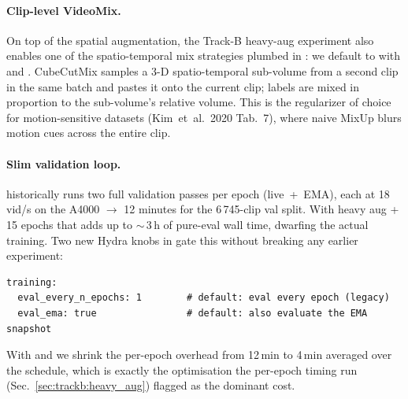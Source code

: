 \paragraph{Clip-level VideoMix.}
On top of the spatial augmentation, the Track-B heavy-aug experiment
also enables one of the
spatio-temporal mix strategies plumbed in : we
default to  with
 and . CubeCutMix
\cite{Yun2019CutMix} samples a 3-D spatio-temporal sub-volume from a
second clip in the same batch and pastes it onto the current clip;
labels are mixed in proportion to the sub-volume's relative volume.
This is the regularizer of choice for motion-sensitive datasets
(Kim~et~al.~2020 Tab.~7), where naive MixUp blurs motion cues across
the entire clip.

\paragraph{Slim validation loop.}
 historically runs two full validation passes
per epoch (live~+~EMA), each at 18\,vid/s on the A4000 \(\to\) 12
minutes for the 6\,745-clip val split. With heavy aug + 15 epochs that
adds up to \(\sim\)\,3\,h of pure-eval wall time, dwarfing the actual
training. Two new Hydra knobs in 
gate this without breaking any earlier experiment:
\begin{lstlisting}[style=yaml]
training:
  eval_every_n_epochs: 1        # default: eval every epoch (legacy)
  eval_ema: true                # default: also evaluate the EMA snapshot
\end{lstlisting}
With  and  we
shrink the per-epoch overhead from 12\,min to 4\,min averaged over the
schedule, which is exactly the optimisation the per-epoch timing run
(Sec.~\ref{sec:trackb:heavy_aug}) flagged as the dominant cost.

